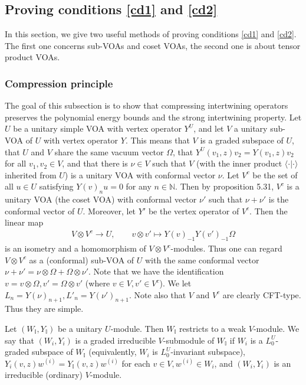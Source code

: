 \documentclass[12pt,a4paper]{article}
\theoremstyle{definition}
\theoremstyle{plain}
\newcommand{\bk}[1]{\langle {#1}\rangle}
\newcommand{\mbb}{\mathbb}
\numberwithin{equation}{subsection}
\begin{document}
\subsection{Proving conditions \ref{cd1} and \ref{cd2}}

In this section, we give two useful methods of proving conditions \ref{cd1} and \ref{cd2}. The first one concerns sub-VOAs and coset VOAs, the second one is about tensor product VOAs.


\subsubsection*{Compression principle}



The goal of this subsection is to show that compressing intertwining operators preserves the polynomial energy bounds and the strong intertwining property. Let $U$ be a unitary simple VOA with vertex operator $Y^U$, and let $V$ a unitary sub-VOA of $U$ with vertex operator $Y$. This means that $V$ is a graded subspace of $U$, that $U$ and $V$ share the same vacuum vector $\Omega$, that $Y^U(v_1,z)v_2=Y(v_1,z)v_2$ for all $v_1,v_2\in V$, and that there is $\nu\in V$ such that $V$ (with the inner product $\bk {\cdot|\cdot}$ inherited from $U$) is a unitary VOA with conformal vector $\nu$. Let $V^c$ be the set of all $u\in U$ satisfying $Y(v)_nu=0$ for any $n\in\mbb N$. Then by \cite{CKLW18} proposition 5.31, $V^c$ is a unitary VOA (the coset VOA) with conformal vector $\nu'$ such that $\nu+\nu'$ is the conformal vector of $U$. Moreover, let $Y'$ be the vertex operator of $V^c$. Then the linear map
\begin{align*}
V\otimes V^c\rightarrow U,\qquad v\otimes v'\mapsto Y(v)_{-1}Y(v')_{-1}\Omega
\end{align*}
is an isometry and a homomorphism of $V\otimes V^c$-modules. Thus one can regard $V\otimes V^c$ as a (conformal) sub-VOA of $U$ with the same conformal vector $\nu+\nu'=\nu\otimes\Omega+\Omega\otimes\nu'$. Note that we have the identification $v=v\otimes\Omega,v'=\Omega\otimes v'$ (where $v\in V,v'\in V^c$). We let $L_n=Y(\nu)_{n+1},L'_n=Y(\nu')_{n+1}$. Note also that $V$ and $V^c$ are clearly CFT-type. Thus they are simple.

Let $(W_{\mbb I},Y_{\mbb I})$ be a unitary $U$-module. Then $W_{\mbb I}$ restricts to a weak $V$-module. We say that $(W_i,Y_i)$  is  a graded irreducible $V$-submodule of $W_{\mbb I}$ if $W_i$ is a $L_0^U$-graded subspace of $W_{\mbb I}$ (equivalently, $W_i$ is $L_0^U$-invariant subspace),  $Y_i(v,z)w^{(i)}=Y_{\mbb I}(v,z)w^{(i)}$ for each $v\in V,w^{(i)}\in W_i$, and $(W_i, Y_i)$ is an irreducible (ordinary) $V$-module.
\end{document}
